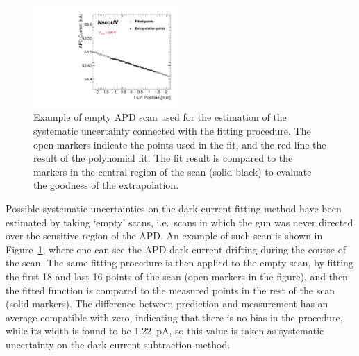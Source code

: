 \documentclass[12p]{paper}
\begin{document}
\begin{figure}[tb]
  \centering
\includegraphics[width=0.49\textwidth]{figures/apdSyst.pdf}
 \caption{Example of empty APD scan used for the estimation of the systematic uncertainty connected with the fitting procedure. The open markers indicate the points used in the fit, and the red line the result of the polynomial fit. The fit result is compared to the markers in the central region of the scan (solid black) to evaluate the goodness of the extrapolation.
  \label{fig:apd_syst}}
\end{figure}

Possible systematic uncertainties on the dark-current fitting method have been estimated by taking `empty' scans, i.e.~scans in which the gun was never directed over the sensitive region of the APD. An example of such scan is shown in Figure~\ref{fig:apd_syst}, where one can see the APD dark current drifting during the course of the scan. The same fitting procedure is then applied to the empty scan, by fitting the first 18 and last 16 points of the scan (open markers in the figure), and then the fitted function is compared to the measured points in the rest of the scan (solid markers). The difference between prediction and measurement has an average compatible with zero, indicating that there is no bias in the procedure, while its width is found to be 1.22~pA, so this value is taken as systematic uncertainty on the dark-current subtraction method. 
\end{document}
